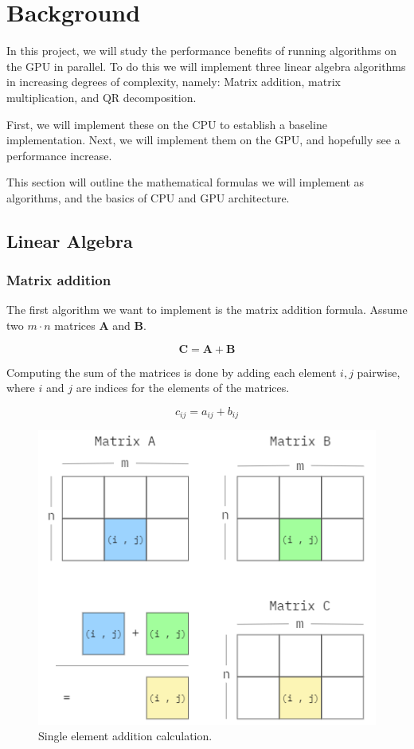 \section{Background} \label{sect:backgroundw}

In this project, we will study the performance benefits of running algorithms on the GPU in parallel. To do this we will implement three linear algebra algorithms in increasing degrees of complexity, namely: Matrix addition, matrix multiplication, and QR decomposition.

First, we will implement these on the CPU to establish a baseline implementation. Next, we will implement them on the GPU, and hopefully see a performance increase.

This section will outline the mathematical formulas we will implement as algorithms, and the basics of CPU and GPU architecture.

\subsection{Linear Algebra}

\subsubsection{Matrix addition}

The first algorithm we want to implement is the matrix addition formula. Assume two \(m \cdot n\) matrices \(\mathbf{A}\) and \(\mathbf{B}\). 

\[\mathbf{C} = \mathbf{A} + \mathbf{B}\]

Computing the sum of the matrices is done by adding each element \(i,j\) pairwise, where \(i\) and \(j\) are indices for the elements of the matrices.

\[c_{ij} = a_{ij} + b_{ij}\]

\begin{figure}[H]
\includegraphics[scale=.65]{Documents/Report/Figures/MatrixAddition.png}
\centering
\caption{Single element addition calculation.}
\label{fig:addition_illustration}
\end{figure}

